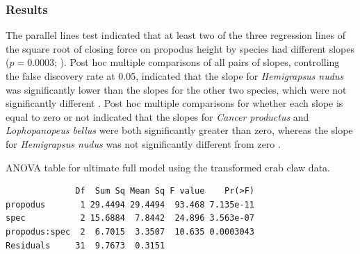 \documentclass[10pt,openany]{book}\usepackage[]{graphicx}\usepackage[]{color}
\makeatletter
\newenvironment{kframe}{%
 \def\at@end@of@kframe{}%
 \ifinner\ifhmode%
  \def\at@end@of@kframe{\end{minipage}}%
  \begin{minipage}{\columnwidth}%
 \fi\fi%
 \def\FrameCommand##1{\hskip\@totalleftmargin \hskip-\fboxsep
 \colorbox{shadecolor}{##1}\hskip-\fboxsep
     \hskip-\linewidth \hskip-\@totalleftmargin \hskip\columnwidth}%
 \MakeFramed {\advance\hsize-\width
   \@totalleftmargin\z@ \linewidth\hsize
   \@setminipage}}%
 {\par\unskip\endMakeFramed%
 \at@end@of@kframe}
\newenvironment{knitrout}{}{} %
\makeatother
\begin{document}
\subsubsection*{Results}
The parallel lines test indicated that at least two of the three regression lines of the square root of closing force on propodus height by species had different slopes ($p=0.0003$; ).  Post hoc multiple comparisons of all pairs of slopes, controlling the false discovery rate at 0.05, indicated that the slope for \emph{Hemigrapsus nudus} was significantly lower than the slopes for the other two species, which were not significantly different .  Post hoc multiple comparisons for whether each slope is equal to zero or not indicated that the slopes for \emph{Cancer productus} and \emph{Lophopanopeus bellus} were both significantly greater than zero, whereas the slope for \emph{Hemigrapsus nudus} was not significantly different from zero .

\begin{table}[h]
  \centering
  \caption{ANOVA table for ultimate full model using the transformed crab claw data.}\label{tab:IVRCrabParallelTest}
\begin{knitrout}
\color{fgcolor}\begin{kframe}
\begin{verbatim}
              Df  Sum Sq Mean Sq F value    Pr(>F)
propodus       1 29.4494 29.4494  93.468 7.135e-11
spec           2 15.6884  7.8442  24.896 3.563e-07
propodus:spec  2  6.7015  3.3507  10.635 0.0003043
Residuals     31  9.7673  0.3151                  
\end{verbatim}
\end{kframe}
\end{knitrout}
\end{table}
\end{document}
